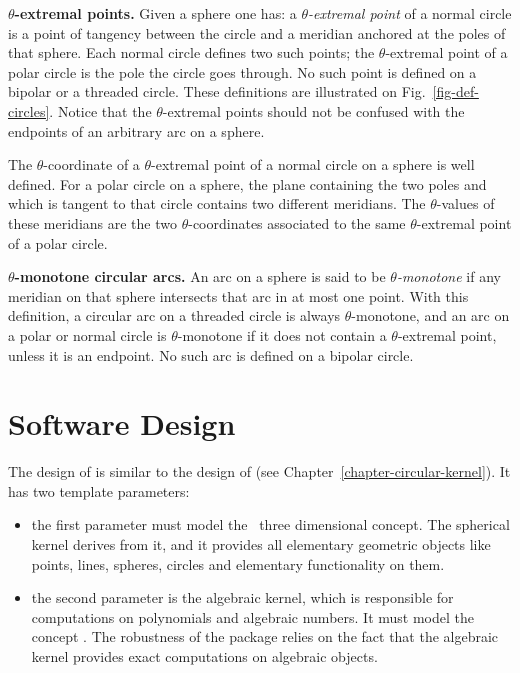 \textbf{$\theta$-extremal points.}
Given a sphere one has:
a \textit{$\theta$-extremal point} of a normal circle is a point of
tangency between the circle and a meridian anchored at the poles of
that sphere.  Each normal circle defines two such points;
the $\theta$-extremal point of a polar circle is the pole the circle
goes through.  No such point is defined on a bipolar or a threaded
circle. 
These definitions are illustrated on Fig.~\ref{fig-def-circles}.
Notice that the $\theta$-extremal points should not be confused with
the endpoints of an arbitrary arc on a sphere.

The $\theta$-coordinate of a $\theta$-extremal point of a normal
circle on a sphere is well defined.
For a polar circle on a sphere, the plane containing the two poles and which is
tangent to that circle contains two different meridians. The
$\theta$-values of these meridians are the two $\theta$-coordinates
associated to the same $\theta$-extremal point of a polar circle.

\textbf{$\theta$-monotone circular arcs.}
An arc on a sphere is said to be \textit{$\theta$-monotone} if any meridian
on that sphere intersects that arc in at most one point. With this definition, a
circular arc on a threaded circle is always $\theta$-monotone, and an
arc on a polar or normal circle is $\theta$-monotone if it does not
contain a $\theta$-extremal point, unless it is an endpoint. No such
arc is defined on a bipolar circle.

\section{Software Design}

The design of  is similar to the design of
 (see Chapter~\ref{chapter-circular-kernel}). 
It has two template parameters:
\begin{itemize}
\item {} the first parameter must model the \cgal\ 
three dimensional  concept. The spherical kernel derives
from it, and it provides all elementary geometric objects like points,
lines, spheres, circles and elementary functionality on them.
\item {} the second parameter is the algebraic kernel, which is 
responsible for computations on polynomials and algebraic numbers. It 
must model the concept \ccc{AlgebraicKernelForSpheres}. The
robustness of the package relies on the fact that the algebraic kernel
provides exact computations on algebraic objects.
\end{itemize}

